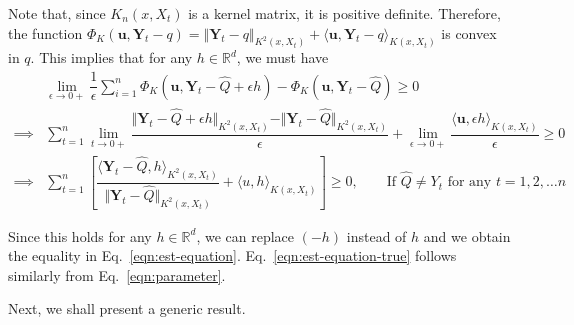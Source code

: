 \documentclass[11pt]{article}
\makeatletter
\def\R{\mathbb{R}}
\newcommand{\bb}[1]{\boldsymbol{#1}}
\theoremstyle{general}
\renewenvironment{proof}[1][\proofname]{\par
    \pushQED{\qed}%
    \normalfont \topsep6\p@\@plus6\p@\relax
    \trivlist
    \item\relax{
        \bfseries
        #1\@addpunct{.}}\hspace\labelsep\ignorespaces
    }{%
     \popQED\endtrivlist\@endpefalse
     }
\numberwithin{equation}{section}
\makeatother
\begin{document}
\begin{proof}

Note that, since $K_n(x, X_t)$ is a kernel matrix, it is positive definite. Therefore, the function $\Phi_K(\bb{u}, \bb{Y}_t - q) = \Vert \bb{Y}_t - q\Vert_{K^2(x, X_t)} + \langle \bb{u}, \bb{Y}_t - q\rangle_{K(x, X_t)}$ is convex in $q$. This implies that for any $h \in \R^d$, we must have 
\begin{align*}
    & \lim_{\epsilon \rightarrow 0+} \dfrac{1}{\epsilon}\sum_{i=1}^n \Phi_K(\bb{u}, \bb{Y}_t - \widehat{Q} + \epsilon h) - \Phi_K(\bb{u}, \bb{Y}_t - \widehat{Q} ) \geq 0\\
    \implies & \sum_{t=1}^n \lim_{t \rightarrow 0+} \dfrac{\Vert \bb{Y}_t - \widehat{Q} + \epsilon h \Vert_{K^2(x, X_t)} - \Vert \bb{Y}_t - \widehat{Q} \Vert_{K^2(x, X_t)} }{ \epsilon } + \lim_{\epsilon \rightarrow 0+} \dfrac{ \langle \bb{u}, \epsilon h \rangle_{K(x,X_t)} }{\epsilon} \geq 0\\
    \implies & \sum_{t=1}^{n} \left[ \dfrac{\langle \bb{Y}_t - \widehat{Q}, h\rangle_{K^2(x, X_t)} }{ \Vert \bb{Y}_t - \widehat{Q} \Vert_{K^2(x, X_t)} } + \langle u, h\rangle_{K(x, X_t)} \right] \geq 0, \qquad \text{If } \widehat{Q} \neq Y_t \text{ for any }t = 1, 2, \dots n
\end{align*}

Since this holds for any $h \in \R^d$, we can replace $(-h)$ instead of $h$ and we obtain the equality in Eq.~\eqref{eqn:est-equation}. Eq.~\eqref{eqn:est-equation-true} follows similarly from Eq.~\eqref{eqn:parameter}.
\end{proof}

Next, we shall present a generic result.
\end{document}
